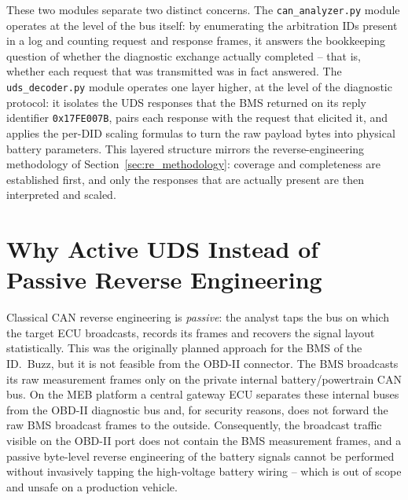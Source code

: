 \documentclass[11pt,a4paper,oneside,parskip=half]{scrreprt}
\providecommand{\hex}{}\renewcommand{\hex}[1]{\texttt{0x#1}}
\begin{document}
These two modules separate two distinct concerns. The \texttt{can\_analyzer.py} module operates at the level of the bus itself: by enumerating the arbitration IDs present in a log and counting request and response frames, it answers the bookkeeping question of whether the diagnostic exchange actually completed -- that is, whether each request that was transmitted was in fact answered. The \texttt{uds\_decoder.py} module operates one layer higher, at the level of the diagnostic protocol: it isolates the UDS responses that the BMS returned on its reply identifier \hex{17FE007B}, pairs each response with the request that elicited it, and applies the per-DID scaling formulas to turn the raw payload bytes into physical battery parameters. This layered structure mirrors the reverse-engineering methodology of Section~\ref{sec:re_methodology}: coverage and completeness are established first, and only the responses that are actually present are then interpreted and scaled.

\section{Why Active UDS Instead of Passive Reverse Engineering}
\label{sec:why_uds}
Classical CAN reverse engineering is \textit{passive}: the analyst taps the bus on which the target ECU broadcasts, records its frames and recovers the signal layout statistically. This was the originally planned approach for the BMS of the ID.~Buzz, but it is not feasible from the OBD-II connector. The BMS broadcasts its raw measurement frames only on the private internal battery/powertrain CAN bus. On the MEB platform a central gateway ECU separates these internal buses from the OBD-II diagnostic bus and, for security reasons, does not forward the raw BMS broadcast frames to the outside. Consequently, the broadcast traffic visible on the OBD-II port does not contain the BMS measurement frames, and a passive byte-level reverse engineering of the battery signals cannot be performed without invasively tapping the high-voltage battery wiring -- which is out of scope and unsafe on a production vehicle.
\end{document}
